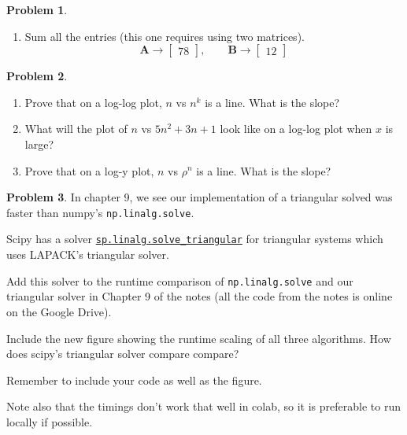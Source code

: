 \documentclass[12pt]{article}
\theoremstyle{definition}
\newtheorem{problem}{Problem}
\renewcommand{\vec}{\mathbf}
\begin{document}
\begin{problem}
\begin{enumerate}
    \item Sum all the entries (this one requires using two matrices).
    \[
        \vec{A} \to  
        \begin{bmatrix}
            78
        \end{bmatrix}
        ,\qquad 
        \vec{B} \to 
        \begin{bmatrix}
            12
        \end{bmatrix}
    \]

    \end{enumerate}
\end{problem}


\begin{problem}

    \begin{enumerate}
        \item Prove that on a log-log plot, $n$ vs $n^k$ is a line. What is the slope?
        \item What will the plot of $n$ vs $5n^2 + 3n + 1$ look like on a log-log plot when $x$ is large?
        \item Prove that on a log-y plot, $n$ vs $\rho^n$ is a line. What is the slope?
    \end{enumerate}

\end{problem}

\begin{problem}

    In chapter 9, we see our implementation of a triangular solved was faster than numpy's \lstinline{np.linalg.solve}.

    Scipy has a solver \href{https://docs.scipy.org/doc/scipy/reference/generated/scipy.linalg.solve_triangular.html}{\lstinline{sp.linalg.solve_triangular}} for triangular systems which uses LAPACK's triangular solver.

    Add this solver to the runtime comparison of \lstinline{np.linalg.solve} and our triangular solver in Chapter 9 of the notes (all the code from the notes is online on the Google Drive).
    
    Include the new figure showing the runtime scaling of all three algorithms.
    How does scipy's triangular solver compare compare?

    Remember to include your code as well as the figure.

    Note also that the timings don't work that well in colab, so it is preferable to run locally if possible.

\end{problem}
\end{document}
